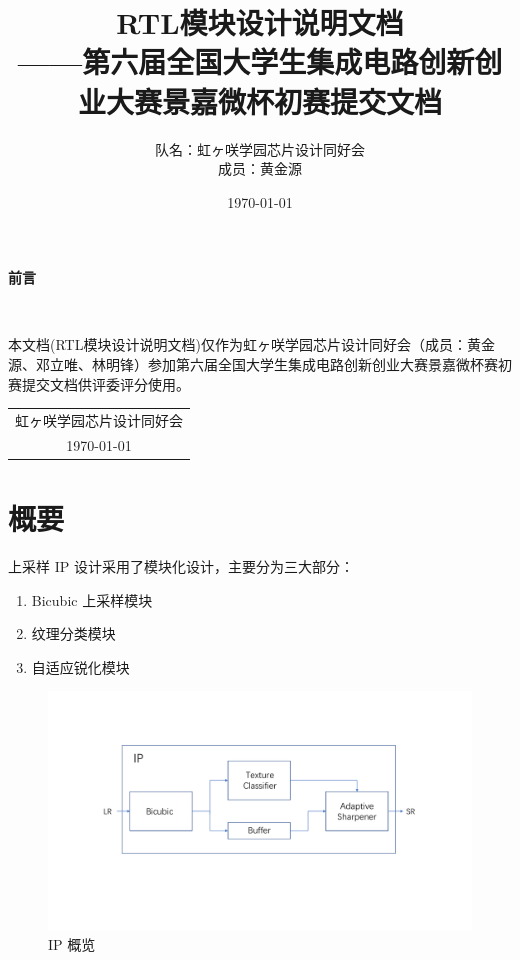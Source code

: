 \documentclass[12pt, a4paper, oneside]{ctexbook}
\title{{\Huge{\textbf{RTL模块设计说明文档}}}\normalsize{\\——第六届全国大学生集成电路创新创业大赛景嘉微杯初赛提交文档}}
\author{队名：虹ヶ咲学园芯片设计同好会\\ 成员：黄金源\space邓立唯\space林明锋}
\date{\today}
\begin{document}
	
	\maketitle	
	\setcounter{page}{1}
	\begin{center}
		\Huge\textbf{前言}
	\end{center}~\
	
	本文档(RTL模块设计说明文档)仅作为虹ヶ咲学园芯片设计同好会（成员：黄金源、邓立唯、林明锋）参加第六届全国大学生集成电路创新创业大赛景嘉微杯赛初赛提交文档供评委评分使用。
	~\\
	\begin{flushright}
		\begin{tabular}{c}
			虹ヶ咲学园芯片设计同好会\\
			\today
		\end{tabular}
	\end{flushright}
	\newpage
	\setcounter{page}{1}
	\tableofcontents
	\newpage
	\setcounter{page}{1}
	
	\chapter{概要}
	上采样 IP 设计采用了模块化设计，主要分为三大部分：
	\begin{enumerate}
		\item Bicubic 上采样模块
		\item 纹理分类模块
		\item 自适应锐化模块
	\end{enumerate}
	
	\begin{figure}[h]
		\centering
		\includegraphics[scale=0.65]{pic/Overview.pdf}
		\caption{IP 概览}
		\label{fig:ip-overview}
	\end{figure}
	
\end{document}
